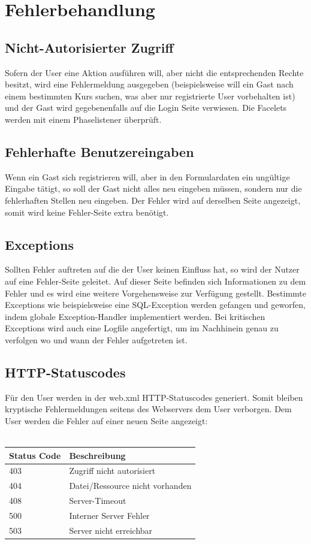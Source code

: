 \section{Fehlerbehandlung}
	\subsection{Nicht-Autorisierter Zugriff}
	Sofern der User eine Aktion ausführen will, aber nicht die entsprechenden Rechte besitzt, wird eine Fehlermeldung ausgegeben (beispielsweise will ein Gast nach einem bestimmten Kurs suchen, was aber nur registrierte User vorbehalten ist) und der Gast wird gegebenenfalls auf die Login Seite verwiesen. Die Facelets werden mit einem Phaselistener überprüft.
	\subsection{Fehlerhafte Benutzereingaben}
	Wenn ein Gast sich registrieren will, aber in den Formulardaten ein ungültige Eingabe tätigt, so soll der Gast nicht alles neu eingeben müssen, sondern nur die fehlerhaften Stellen neu eingeben. Der Fehler wird auf derselben Seite angezeigt, somit wird keine Fehler-Seite extra benötigt.
	\subsection{Exceptions}
	Sollten Fehler auftreten auf die der User keinen Einfluss hat, so wird der Nutzer auf eine Fehler-Seite geleitet. Auf dieser Seite befinden sich Informationen zu dem Fehler und es wird eine weitere Vorgehensweise zur Verfügung gestellt. Bestimmte Exceptions wie beispielsweise eine SQL-Exception werden gefangen und geworfen, indem globale Exception-Handler implementiert werden. Bei kritischen Exceptions wird auch eine Logfile angefertigt, um im Nachhinein genau zu verfolgen wo und wann der Fehler aufgetreten ist.
	\subsection{HTTP-Statuscodes}
	Für den User werden in der web.xml HTTP-Statuscodes generiert. Somit bleiben kryptische Fehlermeldungen seitens des Webservers dem User verborgen. Dem User werden die Fehler auf einer neuen Seite angezeigt: \\ \\
	\begin{tabular}{|l|l|}
		\hline
		Status Code & Beschreibung \\
		\hline
		403 & Zugriff nicht autorisiert \\
		404 & Datei/Ressource nicht vorhanden \\
		408 & Server-Timeout \\
		500 & Interner Server Fehler \\
		503 & Server nicht erreichbar \\
		\hline
 	\end{tabular}		     


